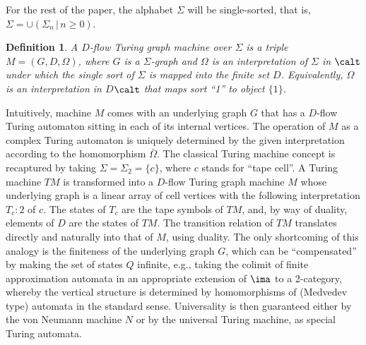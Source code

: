 \documentclass{eptcs}
\newtheorem{definition}{Definition}
\begin{document}
For the rest of the paper, the alphabet $\Sigma $ will be single-sorted, that is,
$\Sigma =\cup (\Sigma _n\,|\,n\geq 0)$.
\begin{definition} {\em A {\em $D$-flow Turing graph machine\/} 
over $\Sigma $ is a triple
$M=(G,D,\Omega )$, where $G$ is a $\Sigma $-graph and $\Omega $ is an interpretation of $\Sigma $
in $\calt $ under which the single sort of $\Sigma $ is mapped into the {\em finite\/} set $D$.
Equivalently, $\Omega $ is an interpretation in $D$\dil $\calt $ that maps sort
``1'' to object $\{1\}$.} 
\end{definition}


Intuitively, machine $M$ comes with an underlying graph $G$ that has a $D$-flow Turing 
automaton sitting in each of its internal vertices. The operation of $M$ as a complex
Turing automaton is uniquely determined by the given interpretation according to the homomorphism
$\bar \Omega $. The classical Turing machine concept is recaptured by taking $\Sigma =
\Sigma _2=\{c\}$, where $c$ stands for ``tape cell''. A Turing machine $TM$ is 
transformed into a $D$-flow Turing graph machine $M$ whose underlying graph is a linear
array of cell vertices with the following interpretation $T_c:2$ of $c$. The states of $T_c$ are
the tape symbols of $TM$, and, by way of duality, elements of $D$ are the states of $TM$.
The transition relation of $TM$ translates directly and naturally into that of $M$,
using duality. The only shortcoming of this
analogy is the finiteness of the underlying graph $G$, which can be ``compensated'' by
making the set of states $Q$ infinite, e.g., taking the colimit of finite approximation
automata in an appropriate extension of $\ima $ to a 2-category, whereby the
vertical structure is determined by homomorphisms of (Medvedev type) automata
in the standard sense.  Universality is then guaranteed either by the von Neumann machine
$N$ or by the universal Turing machine, as special Turing automata.
\end{document}
